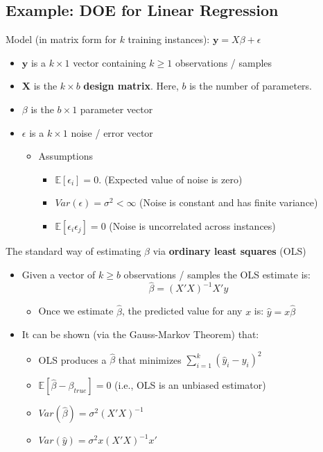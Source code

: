 \documentclass[10pt]{article}
\begin{document}
\subsection*{Example: DOE for Linear Regression}
Model (in matrix form for $k$ training instances): $\mathbf{y} = X\beta + \epsilon$
\begin{itemize}
	\item $\mathbf{y}$ is a $k \times 1$ vector containing $k \geq 1$ observations / samples
	\item $\mathbf{X}$ is the $k \times b$ \textbf{design matrix}.  Here, $b$ is the number of parameters.
	\item $\beta$ is the $b \times 1$ parameter vector
	\item $\epsilon$ is a $k \times 1$ noise / error vector
	\begin{itemize}
	    \item Assumptions
	    \begin{itemize}
	        \item $\mathbb{E}[\epsilon_i] = 0$.  (Expected value of noise is zero)
	        \item $Var(\epsilon) = \sigma^2 < \infty$  (Noise is constant and has finite variance)
	        \item $\mathbb{E}[\epsilon_i \epsilon_j] = 0$  (Noise is uncorrelated across instances)
        \end{itemize}
    \end{itemize}
\end{itemize}
The standard way of estimating $\beta$ via \textbf{ordinary least squares} (OLS)
\begin{itemize}
	\item Given a vector of $k \geq b$ observations / samples the OLS estimate is:
	\[\hat{\beta} = (X' X)^{-1} X' y\]
    \begin{itemize}
	    \item Once we estimate $\hat{\beta}$, the predicted value for any $x$ is: $\hat{y} = x\hat{\beta}$
    \end{itemize}
    \item It can be shown (via the Gauss-Markov Theorem) that:
    \begin{itemize}
	    \item OLS produces a $\hat{\beta}$ that minimizes $\sum_{i = 1}^k (\hat{y}_i - y_i)^2$
	    \item $\mathbb{E}[\hat{\beta} - \beta_{true}] = 0$  (i.e., OLS is an unbiased estimator)
	    \item $Var(\hat{\beta}) = \sigma^2 (X'X)^{-1}$
	    \item $Var(\hat{y}) = \sigma^2 x (X' X)^{-1} x'$
    \end{itemize}
\end{itemize}
\end{document}
